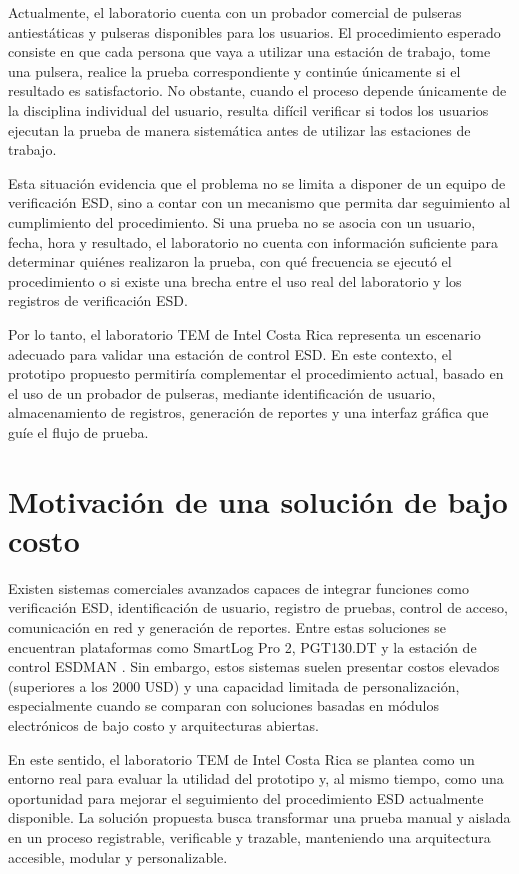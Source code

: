 Actualmente, el laboratorio cuenta con un probador comercial de pulseras antiestáticas y
pulseras disponibles para los usuarios. El procedimiento esperado consiste en que cada
persona que vaya a utilizar una estación de trabajo, tome una pulsera, realice la prueba
correspondiente y continúe únicamente si el resultado es satisfactorio. No obstante, cuando
el proceso depende únicamente de la disciplina individual del usuario, resulta difícil
verificar si todos los usuarios ejecutan la prueba de manera sistemática antes de utilizar
las estaciones de trabajo.

Esta situación evidencia que el problema no se limita a disponer de un equipo de
verificación ESD, sino a contar con un mecanismo que permita dar seguimiento al
cumplimiento del procedimiento. Si una prueba no se asocia con un usuario, fecha, hora
y resultado, el laboratorio no cuenta con información suficiente para determinar quiénes
realizaron la prueba, con qué frecuencia se ejecutó el procedimiento o si existe una brecha
entre el uso real del laboratorio y los registros de verificación ESD.

Por lo tanto, el laboratorio TEM de Intel Costa Rica representa un escenario adecuado
para validar una estación de control ESD. En este contexto, el prototipo
propuesto permitiría complementar el procedimiento actual, basado en el uso de un
probador de pulseras, mediante identificación de usuario, almacenamiento de registros,
generación de reportes y una interfaz gráfica que guíe el flujo de prueba.

\section{Motivación de una solución de bajo costo}

Existen sistemas comerciales avanzados capaces de integrar funciones como verificación
ESD, identificación de usuario, registro de pruebas, control de acceso, comunicación en
red y generación de reportes. Entre estas soluciones se encuentran plataformas como
SmartLog Pro 2, PGT130.DT y la estación de control ESDMAN
\cite{SmartLogPro2} \cite{PGT130DT} \cite{ESDMAN_0016809}. Sin embargo, estos sistemas suelen presentar
costos elevados (superiores a los 2000 USD\cite{ESDMAN_0016809}) 
y una capacidad limitada de personalización, especialmente cuando se
comparan con soluciones basadas en módulos electrónicos de bajo costo y arquitecturas
abiertas.

En este sentido, el laboratorio TEM de Intel Costa Rica se plantea como un entorno
real para evaluar la utilidad del prototipo y, al mismo tiempo, como una oportunidad para
mejorar el seguimiento del procedimiento ESD actualmente disponible. La solución
propuesta busca transformar una prueba manual y aislada en un proceso registrable,
verificable y trazable, manteniendo una arquitectura accesible, modular y personalizable.


